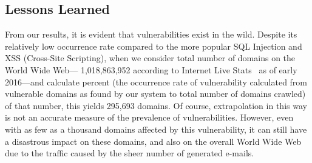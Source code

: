 \subsection{Lessons Learned}

From our results, it is evident that \ehi vulnerabilities exist in the wild.
Despite its relatively low occurrence rate compared to the more popular SQL Injection and XSS (Cross-Site Scripting), when we consider total number of domains on the World Wide Web--- 1,018,863,952 according to Internet Live Stats~\cite{InternetLiveStats2016} as of early 2016---and calculate \successWebsitesDelta percent (the occurrence rate of \ehi vulnerability calculated from vulnerable domains as found by our system to total number of domains crawled) of that number, this yields 295,693 domains. Of course, extrapolation in this way is not an accurate measure of the prevalence of \ehi vulnerabilities. However, even with as few as a thousand domains affected by this vulnerability, it can still have a disastrous impact on these domains, and also on the overall World Wide Web due to the traffic caused by the sheer number of generated e-mails.
    
    
    
